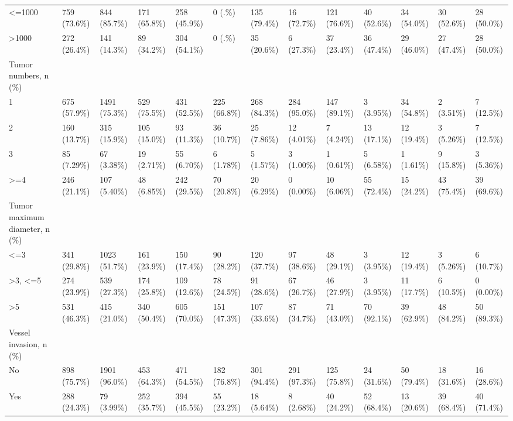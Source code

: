 \begin{landscape}
\begin{center}
\begin{longtable}{p{5.2cm}p{3.0cm}}
<=1000 & 759 (73.6\%) & 844 (85.7\%) & 171 (65.8\%) & 258 (45.9\%) & 0 (.\%) & 135 (79.4\%) & 16 (72.7\%) & 121 (76.6\%) & 40 (52.6\%) & 34 (54.0\%) & 30 (52.6\%) & 28 (50.0\%) \\
>1000 & 272 (26.4\%) & 141 (14.3\%) & 89 (34.2\%) & 304 (54.1\%) & 0 (.\%) & 35 (20.6\%) & 6 (27.3\%) & 37 (23.4\%) & 36 (47.4\%) & 29 (46.0\%) & 27 (47.4\%) & 28 (50.0\%) \\
Tumor numbers, n (\%) &  &  &  &  &  &  &  &  &  &  &  &  \\
1 & 675 (57.9\%) & 1491 (75.3\%) & 529 (75.5\%) & 431 (52.5\%) & 225 (66.8\%) & 268 (84.3\%) & 284 (95.0\%) & 147 (89.1\%) & 3 (3.95\%) & 34 (54.8\%) & 2 (3.51\%) & 7 (12.5\%) \\
2 & 160 (13.7\%) & 315 (15.9\%) & 105 (15.0\%) & 93 (11.3\%) & 36 (10.7\%) & 25 (7.86\%) & 12 (4.01\%) & 7 (4.24\%) & 13 (17.1\%) & 12 (19.4\%) & 3 (5.26\%) & 7 (12.5\%) \\
3 & 85 (7.29\%) & 67 (3.38\%) & 19 (2.71\%) & 55 (6.70\%) & 6 (1.78\%) & 5 (1.57\%) & 3 (1.00\%) & 1 (0.61\%) & 5 (6.58\%) & 1 (1.61\%) & 9 (15.8\%) & 3 (5.36\%) \\
>=4 & 246 (21.1\%) & 107 (5.40\%) & 48 (6.85\%) & 242 (29.5\%) & 70 (20.8\%) & 20 (6.29\%) & 0 (0.00\%) & 10 (6.06\%) & 55 (72.4\%) & 15 (24.2\%) & 43 (75.4\%) & 39 (69.6\%) \\
Tumor maximum diameter, n (\%) &  &  &  &  &  &  &  &  &  &  &  &  \\
<=3 & 341 (29.8\%) & 1023 (51.7\%) & 161 (23.9\%) & 150 (17.4\%) & 90 (28.2\%) & 120 (37.7\%) & 97 (38.6\%) & 48 (29.1\%) & 3 (3.95\%) & 12 (19.4\%) & 3 (5.26\%) & 6 (10.7\%) \\
>3, <=5 & 274 (23.9\%) & 539 (27.3\%) & 174 (25.8\%) & 109 (12.6\%) & 78 (24.5\%) & 91 (28.6\%) & 67 (26.7\%) & 46 (27.9\%) & 3 (3.95\%) & 11 (17.7\%) & 6 (10.5\%) & 0 (0.00\%) \\
>5 & 531 (46.3\%) & 415 (21.0\%) & 340 (50.4\%) & 605 (70.0\%) & 151 (47.3\%) & 107 (33.6\%) & 87 (34.7\%) & 71 (43.0\%) & 70 (92.1\%) & 39 (62.9\%) & 48 (84.2\%) & 50 (89.3\%) \\
Vessel invasion, n (\%) &  &  &  &  &  &  &  &  &  &  &  &  \\
No & 898 (75.7\%) & 1901 (96.0\%) & 453 (64.3\%) & 471 (54.5\%) & 182 (76.8\%) & 301 (94.4\%) & 291 (97.3\%) & 125 (75.8\%) & 24 (31.6\%) & 50 (79.4\%) & 18 (31.6\%) & 16 (28.6\%) \\
Yes & 288 (24.3\%) & 79 (3.99\%) & 252 (35.7\%) & 394 (45.5\%) & 55 (23.2\%) & 18 (5.64\%) & 8 (2.68\%) & 40 (24.2\%) & 52 (68.4\%) & 13 (20.6\%) & 39 (68.4\%) & 40 (71.4\%) \\

\end{longtable}
\end{center}
\end{landscape}
